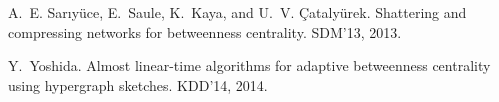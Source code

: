 \documentclass[11pt]{article}
\begin{document}
\begin{thebibliography}{22}
A.~E. Sar{\i}y\"{u}ce, E.~Saule, K.~Kaya, and U.~V. \c{C}ataly\"{u}rek.
\newblock Shattering and compressing networks for betweenness centrality.
\newblock SDM'13, 2013.

Y.~Yoshida.
\newblock Almost linear-time algorithms for adaptive betweenness centrality
  using hypergraph sketches.
\newblock KDD'14, 2014.

\end{thebibliography}
\end{document}
